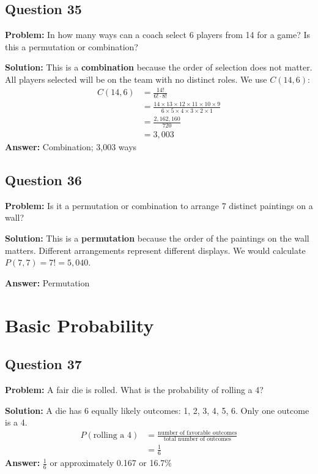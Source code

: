 \documentclass[12pt]{article}
\begin{document}
\subsection*{Question 35}
\textbf{Problem:} In how many ways can a coach select 6 players from 14 for a game? Is this a permutation or combination?

\textbf{Solution:} This is a \textbf{combination} because the order of selection does not matter. All players selected will be on the team with no distinct roles. We use $C(14,6)$:
\begin{align*}
C(14,6) &= \frac{14!}{6! \cdot 8!} \\
&= \frac{14 \times 13 \times 12 \times 11 \times 10 \times 9}{6 \times 5 \times 4 \times 3 \times 2 \times 1} \\
&= \frac{2{,}162{,}160}{720} \\
&= 3{,}003
\end{align*}
\textbf{Answer:} Combination; 3,003 ways

\subsection*{Question 36}
\textbf{Problem:} Is it a permutation or combination to arrange 7 distinct paintings on a wall?

\textbf{Solution:} This is a \textbf{permutation} because the order of the paintings on the wall matters. Different arrangements represent different displays. We would calculate $P(7,7) = 7! = 5{,}040$.

\textbf{Answer:} Permutation

\section{Basic Probability}

\subsection*{Question 37}
\textbf{Problem:} A fair die is rolled. What is the probability of rolling a 4?

\textbf{Solution:} A die has 6 equally likely outcomes: 1, 2, 3, 4, 5, 6. Only one outcome is a 4.
\begin{align*}
P(\text{rolling a 4}) &= \frac{\text{number of favorable outcomes}}{\text{total number of outcomes}} \\
&= \frac{1}{6}
\end{align*}
\textbf{Answer:} $\frac{1}{6}$ or approximately 0.167 or 16.7\%
\end{document}
